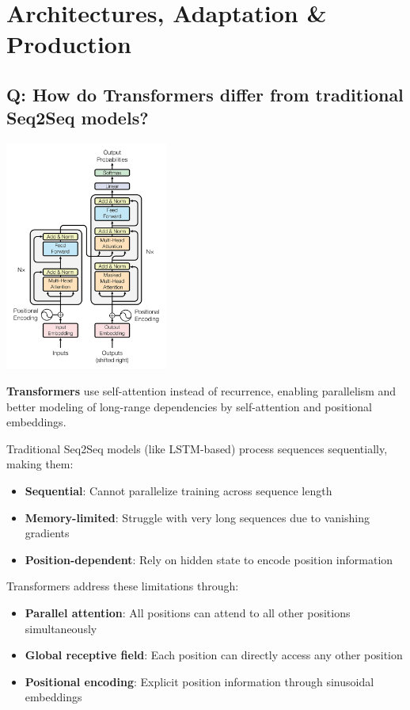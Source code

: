\section{Architectures, Adaptation \& Production}

\subsection*{Q: How do Transformers differ from traditional Seq2Seq models?}
\begin{center}
	\includegraphics[width=0.4\textwidth]{images/transformer_architecture.png}
\end{center}

\textbf{Transformers} use self-attention instead of recurrence, enabling parallelism and better modeling of long-range dependencies by self-attention and positional embeddings.

Traditional Seq2Seq models (like LSTM-based) process sequences sequentially, making them:
\begin{itemize}
	\item \textbf{Sequential}: Cannot parallelize training across sequence length
	\item \textbf{Memory-limited}: Struggle with very long sequences due to vanishing gradients
	\item \textbf{Position-dependent}: Rely on hidden state to encode position information
\end{itemize}

Transformers address these limitations through:
\begin{itemize}
	\item \textbf{Parallel attention}: All positions can attend to all other positions simultaneously
	\item \textbf{Global receptive field}: Each position can directly access any other position
	\item \textbf{Positional encoding}: Explicit position information through sinusoidal embeddings
\end{itemize}

